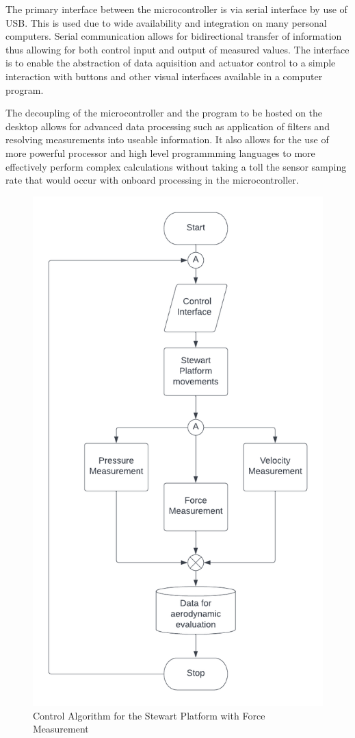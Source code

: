 The primary interface between the microcontroller is via serial interface by use of USB. This is used due to wide availability and integration on many personal computers. Serial communication allows for bidirectional transfer of information thus allowing for both control input and output of measured values. The interface is to enable the abstraction of data aquisition and actuator control to a simple interaction with buttons and other visual interfaces available in a computer program.

The decoupling of the microcontroller and the program to be hosted on the desktop allows for advanced data processing such as application of filters and resolving measurements into useable information. It also allows for the use of more powerful processor and high level programmming languages to more effectively perform complex calculations without taking a toll the sensor samping rate that would occur with onboard processing in the microcontroller.
\begin{center}
	\begin{figure}[!h]
	\centering
	\includegraphics[width=0.7\linewidth]{Figures/Fig14}
	\caption[Control Algorithm]{Control Algorithm for the Stewart Platform with Force Measurement}
	\end{figure}
\end{center}